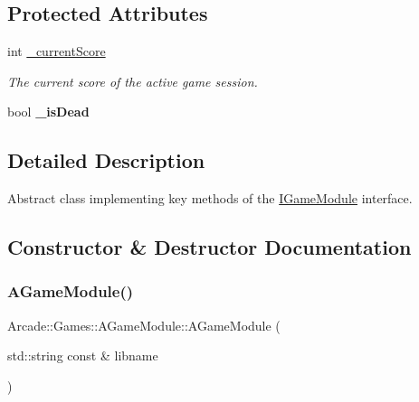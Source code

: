 \subsection*{Protected Attributes}
\begin{DoxyCompactItemize}
\item 
\mbox{\label{classArcade_1_1Games_1_1AGameModule_aec19427e257bb35879871c6853f51a8f}} 
int \mbox{\hyperlink{classArcade_1_1Games_1_1AGameModule_aec19427e257bb35879871c6853f51a8f}{\+\_\+current\+Score}}
\begin{DoxyCompactList}\small\item\em The current score of the active game session. \end{DoxyCompactList}\item 
\mbox{\label{classArcade_1_1Games_1_1AGameModule_a0f22ebc10582d404cf7393d8028cb0c2}} 
bool {\bfseries \+\_\+is\+Dead}
\end{DoxyCompactItemize}


\subsection{Detailed Description}
Abstract class implementing key methods of the \mbox{\hyperlink{classArcade_1_1Games_1_1IGameModule}{I\+Game\+Module}} interface. 

\subsection{Constructor \& Destructor Documentation}
\mbox{\label{classArcade_1_1Games_1_1AGameModule_a489ae3b9ad35cf20ee05be8e3f365a99}} 
\subsubsection{\texorpdfstring{AGameModule()}{AGameModule()}}
{\footnotesize\ttfamily Arcade\+::\+Games\+::\+A\+Game\+Module\+::\+A\+Game\+Module (\begin{DoxyParamCaption}\item[{std\+::string const \&}]{libname }\end{DoxyParamCaption})}



